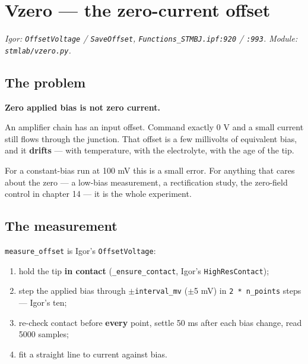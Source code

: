 \setcounter{chapter}{20}
\chapter{Vzero --- the zero-current offset}

\emph{Igor: \texttt{Offset\discretionary{}{}{}Voltage} / \texttt{Save\discretionary{}{}{}Offset}, \texttt{Functions\_\discretionary{}{}{}STMBJ.\discretionary{}{}{}ipf:920} / \texttt{:993}. Module: \texttt{stmlab/\discretionary{}{}{}vzero.\discretionary{}{}{}py}.}

\section{The problem}

\textbf{Zero applied bias is not zero current.}

An amplifier chain has an input offset. Command exactly 0 V and a small current still flows through the junction. That offset is a few millivolts of equivalent bias, and it \textbf{drifts} --- with temperature, with the electrolyte, with the age of the tip.

For a constant-bias run at 100 mV this is a small error. For anything that cares about the zero --- a low-bias measurement, a rectification study, the zero-field control in chapter 14 --- it is the whole experiment.

\section{The measurement}

\texttt{measure\_\discretionary{}{}{}offset} is Igor's \texttt{Offset\discretionary{}{}{}Voltage}:

\begin{enumerate}[leftmargin=*]
\item hold the tip \textbf{in contact} (\texttt{\_\discretionary{}{}{}ensure\_\discretionary{}{}{}contact}, Igor's \texttt{High\discretionary{}{}{}Res\discretionary{}{}{}Contact});
\item step the applied bias through $\pm$\texttt{interval\_\discretionary{}{}{}mv} ($\pm$5 mV) in \texttt{2 * n\_\discretionary{}{}{}points} steps --- Igor's ten;
\item re-check contact before \textbf{every} point, settle 50 ms after each bias change, read 5000 samples;
\item fit a straight line to current against bias.
\end{enumerate}

